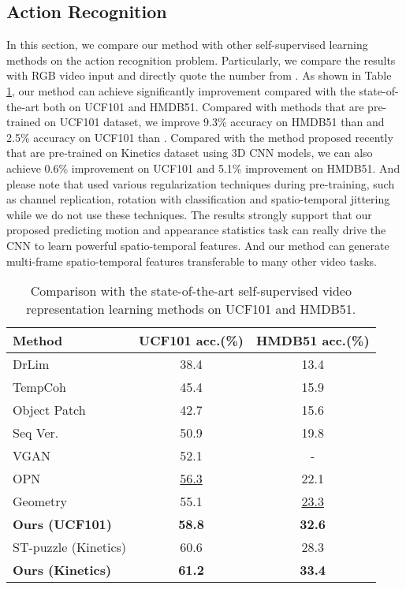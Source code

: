 \documentclass[10pt,twocolumn,letterpaper]{article}
\begin{document}
\subsection{Action Recognition}
In this section, we compare our method with other self-supervised learning methods on the action recognition problem. Particularly, we compare the results with RGB video input and directly quote the number from \cite{gan2018geometry}. As shown in Table \ref{comparison}, our method can achieve significantly improvement compared with the state-of-the-art both on UCF101 and HMDB51. 
Compared with methods that are pre-trained on UCF101 dataset, we improve 9.3\% accuracy on HMDB51 than \cite{gan2018geometry} and 2.5\% accuracy on UCF101 than \cite{lee2017unsupervised}.
Compared with the method proposed recently \cite{kim2018self} that are pre-trained on Kinetics dataset using 3D CNN models, we can also achieve 0.6\% improvement on UCF101 and 5.1\% improvement on HMDB51. 
And please note that \cite{kim2018self} used various regularization techniques during pre-training, such as channel replication, rotation with classification and spatio-temporal jittering while we do not use these techniques.
The results strongly support that our proposed predicting motion and appearance statistics task can really drive the CNN to learn powerful spatio-temporal features. And our method can generate multi-frame spatio-temporal features transferable to many other video tasks. 


\begin{table}[t]
\caption{Comparison with the state-of-the-art self-supervised video representation learning methods on UCF101 and HMDB51.}
\vspace{-18pt}
\begin{center}\begin{adjustbox}{max width=\columnwidth}
\begin{tabular}{lcc}
\toprule
Method & UCF101 acc.(\%) & HMDB51 acc.(\%) \\
\midrule
DrLim \cite{hadsell2006dimensionality}   & 38.4 & 13.4 \\
TempCoh \cite{mobahi2009deep}   & 45.4 & 15.9 \\
Object Patch \cite{wang2015unsupervised}& 42.7 & 15.6 \\
Seq Ver.\cite{misra2016shuffle} & 50.9 & 19.8 \\
VGAN \cite{vondrick2016generating}& 52.1 & -  \\
OPN \cite{lee2017unsupervised}  & \underline{56.3} & 22.1 \\
Geometry \cite{gan2018geometry} & 55.1 & \underline{23.3}\\
\textbf{Ours (UCF101)}   & \textbf{58.8} & \textbf{32.6} \\
\midrule
ST-puzzle (Kinetics) \cite{kim2018self} & 60.6 & 28.3\\ 
\textbf{Ours (Kinetics)}   & \textbf{61.2} & \textbf{33.4} \\
\bottomrule
\end{tabular}
\end{adjustbox}
\end{center}\vspace{-4mm}
\label{comparison}
\end{table}
\end{document}
